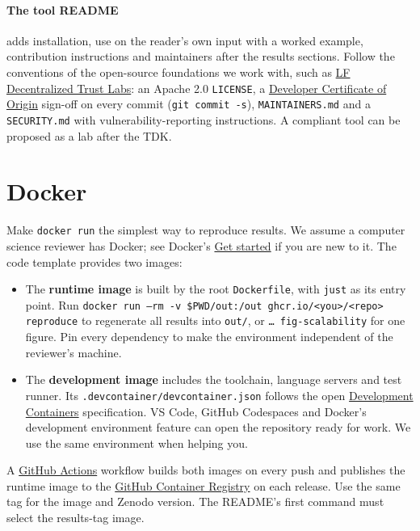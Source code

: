 \paragraph{The tool README} adds installation, use on the reader's own input with a worked example, contribution instructions and maintainers after the results sections. Follow the conventions of the open-source foundations we work with, such as \href{https://github.com/LF-Decentralized-Trust/lab-proposals/blob/main/README.md}{LF Decentralized Trust Labs}: an Apache 2.0 \texttt{LICENSE}, a \href{https://developercertificate.org/}{Developer Certificate of Origin} sign-off on every commit (\texttt{git commit -s}), \texttt{MAINTAINERS.md} and a \texttt{SECURITY.md} with vulnerability-reporting instructions. A compliant tool can be proposed as a lab after the TDK.

\section{Docker}\label{app:code:docker}
Make \texttt{docker run} the simplest way to reproduce results. We assume a computer science reviewer has Docker; see Docker's \href{https://docs.docker.com/get-started/}{Get started} if you are new to it. The code template provides two images:
\begin{itemize}[noitemsep]
  \item The \textbf{runtime image} is built by the root \texttt{Dockerfile}, with \texttt{just} as its entry point. Run \texttt{docker run --rm -v \$PWD/out:/out ghcr.io/<you>/<repo> reproduce} to regenerate all results into \texttt{out/}, or \texttt{\dots{} fig-scalability} for one figure. Pin every dependency to make the environment independent of the reviewer's machine.
  \item The \textbf{development image} includes the toolchain, language servers and test runner. Its \texttt{.devcontainer/devcontainer.json} follows the open \href{https://containers.dev/}{Development Containers} specification. VS Code, GitHub Codespaces and Docker's development environment feature can open the repository ready for work. We use the same environment when helping you.
\end{itemize}
A \href{https://docs.github.com/en/actions}{GitHub Actions} workflow builds both images on every push and publishes the runtime image to the \href{https://docs.github.com/en/packages/working-with-a-github-packages-registry/working-with-the-container-registry}{GitHub Container Registry} on each release. Use the same tag for the image and Zenodo version. The README's first command must select the results-tag image.

